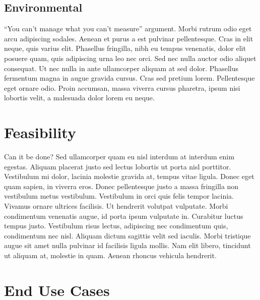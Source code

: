 \subsection{Environmental}

“You can’t manage what you can’t measure” argument. Morbi rutrum odio eget arcu adipiscing sodales. Aenean et purus a est pulvinar pellentesque. Cras in elit neque, quis varius elit. Phasellus fringilla, nibh eu tempus venenatis, dolor elit posuere quam, quis adipiscing urna leo nec orci. Sed nec nulla auctor odio aliquet consequat. Ut nec nulla in ante ullamcorper aliquam at sed dolor. Phasellus fermentum magna in augue gravida cursus. Cras sed pretium lorem. Pellentesque eget ornare odio. Proin accumsan, massa viverra cursus pharetra, ipsum nisi lobortis velit, a malesuada dolor lorem eu neque.


\section{Feasibility}

Can it be done? Sed ullamcorper quam eu nisl interdum at interdum enim egestas. Aliquam placerat justo sed lectus lobortis ut porta nisl porttitor. Vestibulum mi dolor, lacinia molestie gravida at, tempus vitae ligula. Donec eget quam sapien, in viverra eros. Donec pellentesque justo a massa fringilla non vestibulum metus vestibulum. Vestibulum in orci quis felis tempor lacinia. Vivamus ornare ultrices facilisis. Ut hendrerit volutpat vulputate. Morbi condimentum venenatis augue, id porta ipsum vulputate in. Curabitur luctus tempus justo. Vestibulum risus lectus, adipiscing nec condimentum quis, condimentum nec nisl. Aliquam dictum sagittis velit sed iaculis. Morbi tristique augue sit amet nulla pulvinar id facilisis ligula mollis. Nam elit libero, tincidunt ut aliquam at, molestie in quam. Aenean rhoncus vehicula hendrerit.


\section{End Use Cases}


